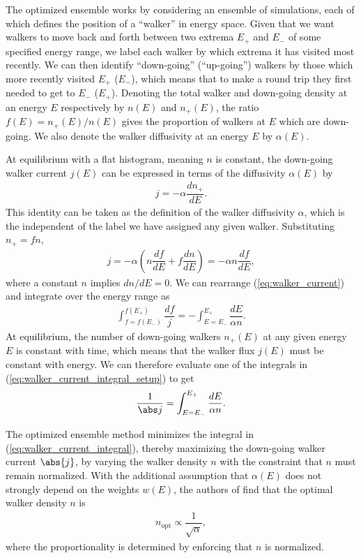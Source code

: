 \documentclass[11pt]{article}
\renewcommand{\t}{\text} %
\newcommand{\f}[2]{\dfrac{#1}{#2}} %
\newcommand{\p}[1]{\left(#1\right)} %
\begin{document}
The optimized ensemble works by considering an ensemble of
simulations, each of which defines the position of a ``walker'' in
energy space. Given that we want walkers to move back and forth
between two extrema $E_+$ and $E_-$ of some specified energy range, we
label each walker by which extrema it has visited most recently. We
can then identify ``down-going'' (``up-going'') walkers by those which
more recently visited $E_+$ ($E_-$), which means that to make a round
trip they first needed to get to $E_-$ ($E_+$). Denoting the total
walker and down-going density at an energy $E$ respectively by
$n\p{E}$ and $n_+\p{E}$, the ratio $f\p{E}=n_+\p{E}/n\p{E}$ gives the
proportion of walkers at $E$ which are down-going. We also denote the
walker diffusivity at an energy $E$ by $\alpha\p{E}$.

At equilibrium with a flat histogram, meaning $n$ is constant, the
down-going walker current $j\p{E}$ can be expressed in terms of the
diffusivity $\alpha\p{E}$ by
\begin{align}
  j=-\alpha\f{dn_+}{dE}.
  \label{eq:walker_current_definition}
\end{align}
This identity can be taken as the definition of the walker diffusivity
$\alpha$, which is the independent of the label we have assigned any
given walker. Substituting $n_+=fn$,
\begin{align}
  j=-\alpha\p{n\f{df}{dE}+f\f{dn}{dE}}=-\alpha n\f{df}{dE},
  \label{eq:walker_current}
\end{align}
where a constant $n$ implies $dn/dE=0$. We can rearrange
(\ref{eq:walker_current}) and integrate over the energy range as
\begin{align}
  \int_{f=f\p{E_-}}^{f\p{E_+}}\f{df}{j}=-\int_{E=E_-}^{E_+}\f{dE}{\alpha
    n}.
  \label{eq:walker_current_integral_setup}
\end{align}
At equilibrium, the number of down-going walkers $n_+\p{E}$ at any
given energy $E$ is constant with time, which means that the walker
flux $j\p{E}$ must be constant with energy. We can therefore evaluate
one of the integrals in (\ref{eq:walker_current_integral_setup}) to
get
\begin{align}
  \f1{\abs j}=\int_{E=E_-}^{E_+}\f{dE}{\alpha n}.
  \label{eq:walker_current_integral}
\end{align}

The optimized ensemble method minimizes the integral in
(\ref{eq:walker_current_integral}), thereby maximizing the down-going
walker current $\abs{j}$, by varying the walker density $n$ with the
constraint that $n$ must remain normalized. With the additional
assumption that $\alpha\p{E}$ does not strongly depend on the weights
$w\p{E}$, the authors of \cite{trebst2004optimizing} find that the
optimal walker density $n$ is
\begin{align}
  n_{\t{opt}}\propto\f1{\sqrt{\alpha}},
  \label{eq:optimal_walker_density}
\end{align}
where the proportionality is determined by enforcing that $n$ is
normalized.
\end{document}
